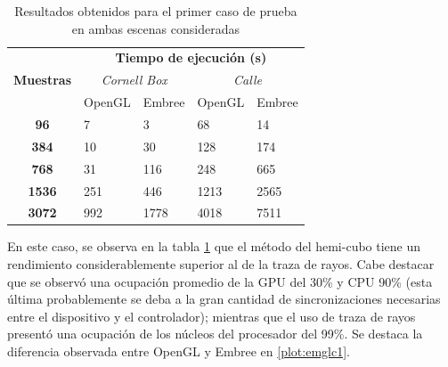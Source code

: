 \begin{table}[H]
	\centering
	\begin{tabular}{|c|l|l|l|l|}
		\hline
		\multirow{3}{*}{\textbf{Muestras}} & \multicolumn{4}{c|}{\textbf{Tiempo de ejecución (s)}}                                                                                  \\ \cline{2-5} 
		& \multicolumn{2}{c|}{\textit{Cornell Box}}                 & \multicolumn{2}{c|}{\textit{Calle}}                      \\ \cline{2-5} 
		& \multicolumn{1}{c|}{OpenGL} & \multicolumn{1}{c|}{Embree} & \multicolumn{1}{c|}{OpenGL} & \multicolumn{1}{c|}{Embree} \\ \hline
		\textbf{96}                        & 7                           & 3                           & 68                          & 14                          \\ \hline
		\textbf{384}                       & 10                          & 30                          & 128                         & 174                         \\ \hline
		\textbf{768}                       & 31                          & 116                         & 248                         & 665                         \\ \hline
		\textbf{1536}                      & 251                         & 446                         & 1213                        & 2565                        \\ \hline
		\textbf{3072}                      & 992                         & 1778                        & 4018                        & 7511                        \\ \hline
	\end{tabular}
	\caption{Resultados obtenidos para el primer caso de prueba en ambas escenas consideradas}
	\label{tab:tablecaso1}
\end{table}

En este caso, se observa en la tabla \ref{tab:tablecaso1} que el método del hemi-cubo tiene un rendimiento considerablemente superior al de la traza de rayos. Cabe destacar que se observó una ocupación promedio de la GPU del 30\% y CPU 90\% (esta última probablemente se deba a la gran cantidad de sincronizaciones necesarias entre el dispositivo y el controlador); mientras que el uso de traza de rayos presentó una ocupación de los núcleos del procesador del 99\%. Se destaca la diferencia observada entre OpenGL y Embree en \ref{plot:emglc1}.

